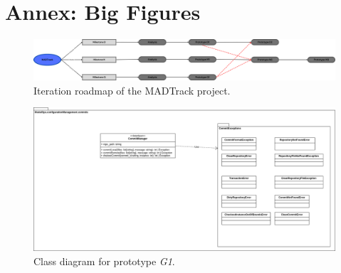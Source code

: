 \chapter{Annex: Big Figures}
\label{cap:AnexoA}

\begin{figure}
    \centering
    \includegraphics[width=\linewidth]{figs/MADTrack-roadmap.png}
    \caption{Iteration roadmap of the MADTrack project.}
    \label{fig:roadmap}
\end{figure}

\begin{figure}
    \centering
    \includegraphics[width=\linewidth]{figs/G1-classDiagram.png}
    \caption{Class diagram for prototype \emph{G1}.}
    \label{fig:G1classDiagram}
\end{figure}
